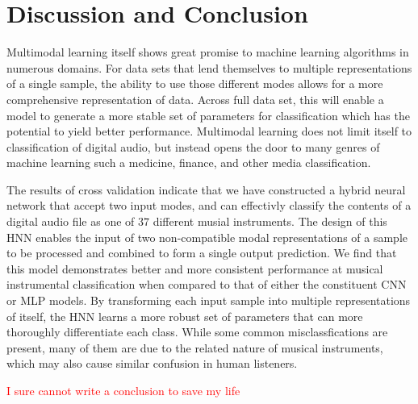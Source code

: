 \documentclass[conference,onecolumn,letterpaper]{IEEEtran}
\begin{document}

\section{Discussion and Conclusion}
\label{sec:conclusion}

Multimodal learning itself shows great promise to machine learning algorithms in numerous domains. For data sets that lend themselves to multiple representations of a single sample, the ability to use those different modes allows for a more comprehensive representation of data. Across full data set, this will enable a model to generate a more stable set of parameters for classification which has the potential to yield better performance. Multimodal learning does not limit itself to classification of digital audio, but instead opens the door to many genres of machine learning such a medicine, finance, and other media classification.
 
The results of cross validation indicate that we have constructed a hybrid neural network that accept two input modes, and can effectivly classify the contents of a digital audio file as one of $37$ different musial instruments. The design of this HNN enables the input of two non-compatible modal representations of a sample to be processed and combined to form a single output prediction. We find that this model demonstrates better and more consistent performance at musical instrumental classification when compared to that of either the constituent CNN or MLP models. By transforming each input sample into multiple representations of itself, the HNN learns a more robust set of parameters that can more thoroughly differentiate each class. While some common misclassfications are present, many of them are due to the related nature of musical instruments, which may also cause similar confusion in human listeners. 

\textcolor{red}{I sure cannot write a conclusion to save my life}



\end{document}
